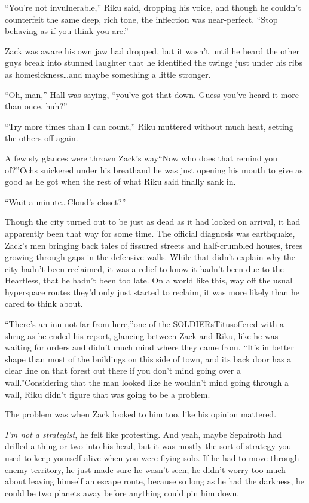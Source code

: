 ``You're not invulnerable,'' Riku said, dropping his voice, and though he couldn't counterfeit the same deep, rich tone, the inflection was near-perfect. ``Stop behaving as if you think you are.''

Zack was aware his own jaw had dropped, but it wasn't until he heard the other guys break into stunned laughter that he identified the twinge just under his ribs as homesickness\ldots and maybe something a little stronger.

``Oh, man,'' Hall was saying, ``you've got that down. Guess you've heard it more than once, huh?''

``Try more times than I can count,'' Riku muttered without much heat, setting the others off again.

A few sly glances were thrown Zack's way\textemdash ``Now who does that remind you of?''Ochs snickered under his breath\textemdash and he was just opening his mouth to give as good as he got when the rest of what Riku said finally sank in.

``Wait a minute\ldots Cloud's closet?''


\scenechange


Though the city turned out to be just as dead as it had looked on arrival, it had apparently been that way for some time. The official diagnosis was earthquake, Zack's men bringing back tales of fissured streets and half-crumbled houses, trees growing through gaps in the defensive walls. While that didn't explain why the city hadn't been reclaimed, it was a relief to know it hadn't been due to the Heartless, that he hadn't been too late. On a world like this, way off the usual hyperspace routes they'd only just started to reclaim, it was more likely than he cared to think about.

``There's an inn not far from here,''one of the SOLDIERs\textemdash Titus\textemdash offered with a shrug as he ended his report, glancing between Zack and Riku, like he was waiting for orders and didn't much mind where they came from. ``It's in better shape than most of the buildings on this side of town, and its back door has a clear line on that forest out there if you don't mind going over a wall.''Considering that the man looked like he wouldn't mind going through a wall, Riku didn't figure that was going to be a problem.

The problem was when Zack looked to him too, like his opinion mattered.

\emph{I'm not a strategist}, he felt like protesting. And yeah, maybe Sephiroth had drilled a thing or two into his head, but it was mostly the sort of strategy you used to keep yourself alive when you were flying solo. If he had to move through enemy territory, he just made sure he wasn't seen; he didn't worry too much about leaving himself an escape route, because so long as he had the darkness, he could be two planets away before anything could pin him down.

